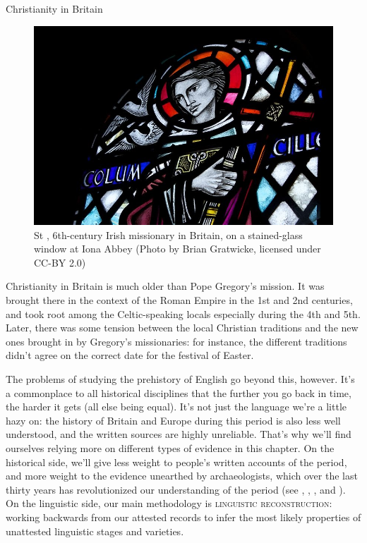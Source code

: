 \largerpage
\begin{peoplebox}{Christianity in Britain}
\begin{figure}
        \vspace*{-5mm}
        \includegraphics[width=\textwidth]{chapters/img/stained-glass_window.png}
    \caption{St , 6th-century Irish missionary in Britain, on a stained-glass window at Iona Abbey (Photo by Brian Gratwicke, licensed under CC-BY 2.0)}
    \label{fig:christianity}
\end{figure}

Christianity in Britain is much older than Pope Gregory's mission. It was brought there in the context of the Roman Empire in the 1st and 2nd centuries, and took root among the Celtic-speaking locals especially during the 4th and 5th. Later, there was some tension between the local Christian traditions and the new ones brought in by Gregory's missionaries: for instance, the different traditions didn't agree on the correct date for the festival of Easter.
\end{peoplebox}

    
\noindent The problems of studying the prehistory of English go beyond this, however. It's a commonplace to all historical disciplines that the further you go back in time, the harder it gets (all else being equal). It's not just the language we're a little hazy on: the history of Britain and Europe during this period is also less well understood, and the written sources are highly unreliable. That's why we'll find ourselves relying more on different types of evidence in this chapter. On the historical side, we'll give less weight to people's written accounts of the period, and more weight to the evidence unearthed by archaeologists, which over the last thirty years has revolutionized our understanding of the period (see \citealp{Fleming2010}, \citealp{Gerrard2013}, \citealp{Higham2013}, and \citealp{Oosthuizen2019}). On the linguistic side, our main methodology is \textsc{linguistic reconstruction}: working backwards from our attested records to infer the most likely properties of unattested linguistic stages and varieties.

